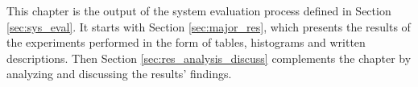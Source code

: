This chapter is the output of the system evaluation process defined in Section \ref{sec:sys_eval}. It starts with Section \ref{sec:major_res}, which presents the results of the experiments performed in the form of tables, histograms and written descriptions. Then Section \ref{sec:res_analysis_discuss} complements the chapter by analyzing and discussing the results' findings.